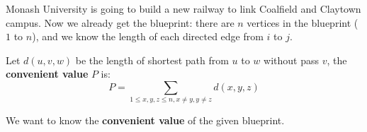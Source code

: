 Monash University is going to build a new railway to link Coalfield and Claytown campus.
Now we already get the blueprint: there are $n$ vertices in the blueprint ($1$ to $n$),
and we know the length of each directed edge from $i$ to $j$.

Let $d(u, v, w)$ be the length of shortest path from $u$ to $w$ without pass $v$,
the \textbf{convenient value} $P$ is:
$$
P = \sum_{1 \le x,y,z \le n, x \neq y, y \neq z}d(x,y,z)
$$

We want to know the \textbf{convenient value} of the given blueprint. 
